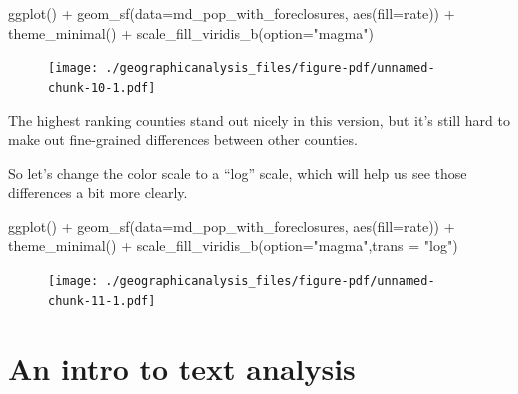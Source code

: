 \documentclass[
  letterpaper,
  DIV=11,
  numbers=noendperiod]{scrreprt}
\newenvironment{Shaded}{\begin{snugshade}}{\end{snugshade}}
\newcommand{\AttributeTok}[1]{\textcolor[rgb]{0.40,0.45,0.13}{#1}}
\newcommand{\FunctionTok}[1]{\textcolor[rgb]{0.28,0.35,0.67}{#1}}
\newcommand{\NormalTok}[1]{\textcolor[rgb]{0.00,0.23,0.31}{#1}}
\newcommand{\SpecialCharTok}[1]{\textcolor[rgb]{0.37,0.37,0.37}{#1}}
\newcommand{\StringTok}[1]{\textcolor[rgb]{0.13,0.47,0.30}{#1}}
\begin{document}
\begin{Shaded}
\begin{Highlighting}[]
\FunctionTok{ggplot}\NormalTok{() }\SpecialCharTok{+}
  \FunctionTok{geom\_sf}\NormalTok{(}\AttributeTok{data=}\NormalTok{md\_pop\_with\_foreclosures, }\FunctionTok{aes}\NormalTok{(}\AttributeTok{fill=}\NormalTok{rate)) }\SpecialCharTok{+}
  \FunctionTok{theme\_minimal}\NormalTok{() }\SpecialCharTok{+}
  \FunctionTok{scale\_fill\_viridis\_b}\NormalTok{(}\AttributeTok{option=}\StringTok{"magma"}\NormalTok{)}
\end{Highlighting}
\end{Shaded}

\begin{figure}[H]

{\centering \texttt{[image: ./geographicanalysis\_files/figure-pdf/unnamed-chunk-10-1.pdf]}

}

\end{figure}

The highest ranking counties stand out nicely in this version, but it's
still hard to make out fine-grained differences between other counties.

So let's change the color scale to a ``log'' scale, which will help us
see those differences a bit more clearly.

\begin{Shaded}
\begin{Highlighting}[]
\FunctionTok{ggplot}\NormalTok{() }\SpecialCharTok{+}
  \FunctionTok{geom\_sf}\NormalTok{(}\AttributeTok{data=}\NormalTok{md\_pop\_with\_foreclosures, }\FunctionTok{aes}\NormalTok{(}\AttributeTok{fill=}\NormalTok{rate)) }\SpecialCharTok{+}
  \FunctionTok{theme\_minimal}\NormalTok{() }\SpecialCharTok{+}
  \FunctionTok{scale\_fill\_viridis\_b}\NormalTok{(}\AttributeTok{option=}\StringTok{"magma"}\NormalTok{,}\AttributeTok{trans =} \StringTok{"log"}\NormalTok{)}
\end{Highlighting}
\end{Shaded}

\begin{figure}[H]

{\centering \texttt{[image: ./geographicanalysis\_files/figure-pdf/unnamed-chunk-11-1.pdf]}

}

\end{figure}


\hypertarget{an-intro-to-text-analysis}{%
\chapter{An intro to text analysis}\label{an-intro-to-text-analysis}}
\end{document}
